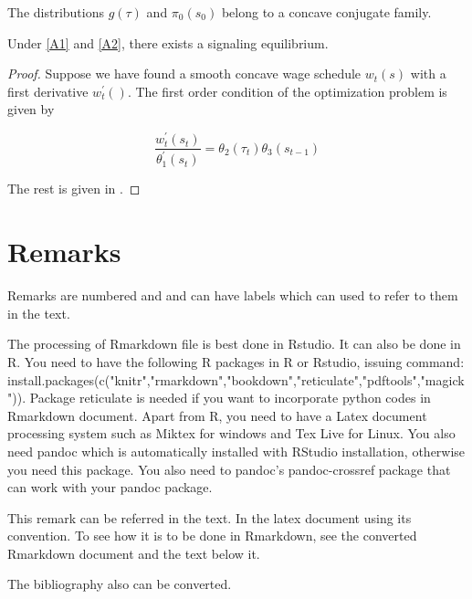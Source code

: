 \documentclass[12pt,svgnames]{article}
\begin{document}
\begin{assumption}
\label{A2}The distributions $g\left( \tau \right)$ and $\pi _{0}\left( s_{0}\right)$ belong to a concave conjugate family.
\end{assumption}

\begin{theorem}
Under \autoref{A1} and \autoref{A2}, there exists a signaling equilibrium.
\end{theorem}

\begin{proof}
Suppose we have found a smooth concave wage schedule $w_{t}\left( s\right)$
with a first derivative $w_{t}^{\prime }\left( {}\right)$. The first order
condition of the optimization problem is given by 

\begin{equation}
\frac{w_{t}^{\prime }\left( s_{t}\right) }{\theta _{1}^{\prime }\left(
s_{t}\right) }=\theta _{2}\left( \tau _{t}\right) \theta _{3}\left(
s_{t-1}\right)  \label{eq10}
\end{equation}

The rest is given in \cite{Raut_2017a}.

\end{proof}

\section{Remarks} \label{sec8}

Remarks are numbered and and can have labels which can used to refer to them in the text.


\begin{remark}
The processing of Rmarkdown file is best done in Rstudio. It can also be done in R. You need to have the following R packages in R or Rstudio, issuing command: install.packages(c("knitr","rmarkdown","bookdown","reticulate","pdftools","magick")). Package reticulate is needed if you want to incorporate python codes in Rmarkdown document. Apart from R, you need to have a Latex document processing system such as Miktex for windows and Tex Live for Linux.  You also need pandoc which is automatically installed with RStudio installation, otherwise you need this package. You also need to pandoc's pandoc-crossref package that can work with your pandoc package.  
\end{remark}


\begin{remark}
\label{re10}This remark can be referred in the text. In the latex document using its convention. To see how it is to be done in Rmarkdown, see the converted Rmarkdown document and the text below it.
\end{remark}

The bibliography also can be converted. 

\printbibliography
\end{document}
